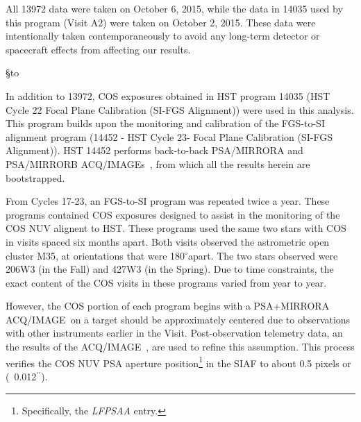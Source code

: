 \documentclass[12pt]{reportj}
\def\arcsec{\hbox{$^{\prime\prime}$}}
\def\degree{$^{\circ}$}
\newcommand*{\myfont}{\fontfamily{rm}\selectfont}
\def\acqimage{{\myfont ACQ/IMAGE}\rm~}
\def\acqimages{{\myfont ACQ/IMAGE{\rm s}}\rm~}
\def\ssection#1{\addtocounter{section}{1} \setcounter{subsection}{0} \S*{\hbox to \hsize{\large\bf \arabic{section}. #1\hfill }}}
\begin{document}
All 13972 data were taken on October 6, 2015, while the data in 14035 used by this program (Visit A2) were taken on October 2, 2015.
These data were intentionally taken contemporaneously to avoid any long-term detector or spacecraft effects from affecting our results.\\

\newpage

\lhead{}
\rhead{}

\clearpage
\ssection{Program Descriptions \label{sec:programs} }

In addition to 13972, COS exposures obtained in HST program 14035 (HST Cycle 22 Focal Plane Calibration (SI-FGS Alignment)) were used in this analysis.
This program builds upon the monitoring and calibration of the FGS-to-SI alignment program (14452 - HST Cycle 23- Focal Plane Calibration (SI-FGS Alignment)).  HST 14452 performs back-to-back PSA/MIRRORA and PSA/MIRRORB \acqimages, from which all the results herein are bootstrapped.

From Cycles 17-23, an FGS-to-SI program was repeated twice a year. These programs contained COS exposures designed to assist in the monitoring of the COS NUV alignent to HST.
These programs used the same two stars with COS in visits spaced six months apart. Both visits observed the astrometric open cluster M35, at orientations that were 180\degree apart.
The two stars observed were 206W3 (in the Fall) and 427W3 (in the Spring). Due to time constraints, the exact content of the COS visits in these programs varied from year to year.

However, the COS portion of each program begins with a PSA+MIRRORA \acqimage on a target should be approximately centered due to observations with other instruments earlier in the Visit.
Post-observation telemetry data, an the results of the \acqimage, are used to refine this assumption.
This process verifies the COS NUV PSA aperture position\footnote{Specifically, the \textit{LFPSAA} entry.} in the SIAF to about 0.5 pixels or (~0.012\arcsec).
\end{document}
